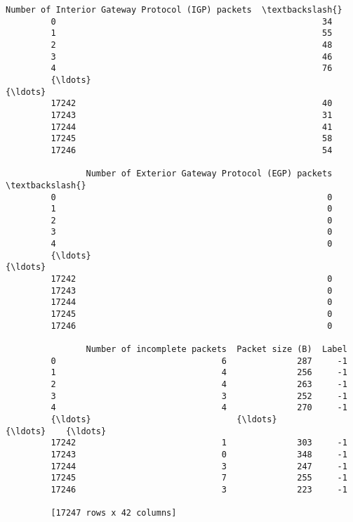 \documentclass[11pt]{article}
\begin{document}
\begin{Verbatim}[commandchars=\\\{\}]
                Number of Interior Gateway Protocol (IGP) packets  \textbackslash{}
         0                                                     34   
         1                                                     55   
         2                                                     48   
         3                                                     46   
         4                                                     76   
         {\ldots}                                                  {\ldots}   
         17242                                                 40   
         17243                                                 31   
         17244                                                 41   
         17245                                                 58   
         17246                                                 54   
         
                Number of Exterior Gateway Protocol (EGP) packets  \textbackslash{}
         0                                                      0   
         1                                                      0   
         2                                                      0   
         3                                                      0   
         4                                                      0   
         {\ldots}                                                  {\ldots}   
         17242                                                  0   
         17243                                                  0   
         17244                                                  0   
         17245                                                  0   
         17246                                                  0   
         
                Number of incomplete packets  Packet size (B)  Label  
         0                                 6              287     -1  
         1                                 4              256     -1  
         2                                 4              263     -1  
         3                                 3              252     -1  
         4                                 4              270     -1  
         {\ldots}                             {\ldots}              {\ldots}    {\ldots}  
         17242                             1              303     -1  
         17243                             0              348     -1  
         17244                             3              247     -1  
         17245                             7              255     -1  
         17246                             3              223     -1  
         
         [17247 rows x 42 columns]
\end{Verbatim}
            
\end{document}
